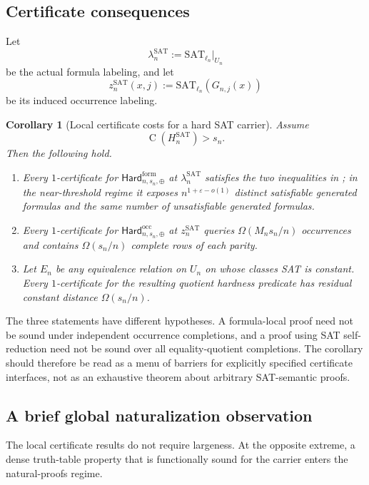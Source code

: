 \documentclass[11pt]{article}
\newtheorem{corollary}[theorem]{Corollary}
\theoremstyle{definition}
\newcommand{\Ckt}{\operatorname{C}}
\newcommand{\SAT}{\mathrm{SAT}}
\newcommand{\eps}{\varepsilon}
\newcommand{\HardF}{\mathsf{Hard}^{\mathrm{form}}}
\newcommand{\HardO}{\mathsf{Hard}^{\mathrm{occ}}}
\begin{document}
\subsection{Certificate consequences}

Let
\[
  \lambda_n^{\SAT}:=\SAT_{\ell_n}|_{U_n}
\]
be the actual formula labeling, and let
\[
  z_n^{\SAT}(x,j):=\SAT_{\ell_n}(G_{n,j}(x))
\]
be its induced occurrence labeling.

\begin{corollary}[Local certificate costs for a hard SAT carrier]\label{cor:sat-costs}
Assume
\[
  \Ckt(H_n^{\SAT})>s_n.
\]
Then the following hold.

\begin{enumerate}
  \item Every $1$-certificate for $\HardF_{n,s_n,\oplus}$ at $\lambda_n^{\SAT}$ satisfies the two inequalities in ; in the near-threshold regime it exposes $n^{1+\eps-o(1)}$ distinct satisfiable generated formulas and the same number of unsatisfiable generated formulas.

  \item Every $1$-certificate for $\HardO_{n,s_n,\oplus}$ at $z_n^{\SAT}$ queries $\Omega(M_ns_n/n)$ occurrences and contains $\Omega(s_n/n)$ complete rows of each parity.

  \item Let $E_n$ be any equivalence relation on $U_n$ on whose classes SAT is constant.  Every $1$-certificate for the resulting quotient hardness predicate has residual constant distance $\Omega(s_n/n)$.
\end{enumerate}
\end{corollary}

The three statements have different hypotheses.  A formula-local proof need not be sound under independent occurrence completions, and a proof using SAT self-reduction need not be sound over all equality-quotient completions.  The corollary should therefore be read as a menu of barriers for explicitly specified certificate interfaces, not as an exhaustive theorem about arbitrary SAT-semantic proofs.

\subsection{A brief global naturalization observation}

The local certificate results do not require largeness.  At the opposite extreme, a dense truth-table property that is functionally sound for the carrier enters the natural-proofs regime.
\end{document}
